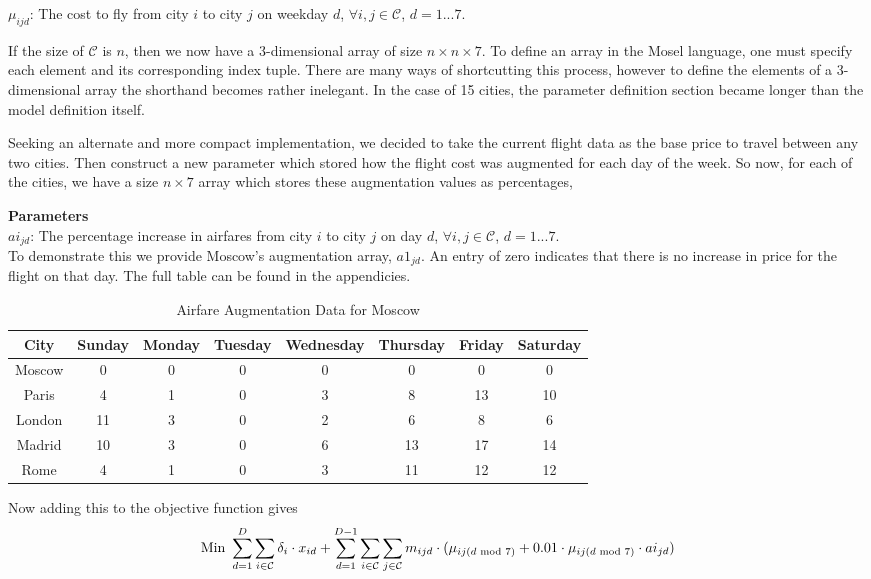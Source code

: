 \documentclass[12pt]{article}
\begin{document}
$\mu_{ijd}$: The cost to fly from city $i$ to city $j$ on weekday $d$, $\forall i,j \in \mathcal{C}$, $d=1...7$.

If the size of $\mathcal{C}$ is $n$, then we now have a 3-dimensional array of size $n\times n\times 7$. To define an array in the Mosel language, one must specify each element and its corresponding index tuple. There are many ways of shortcutting this process, however to define the elements of a 3-dimensional array the shorthand becomes rather inelegant. In the case of 15 cities, the parameter definition section became longer than the model definition itself.

Seeking an alternate and more compact implementation, we decided to take the current flight data as the base price to travel between any two cities. Then construct a new parameter which stored how the flight cost was augmented for each day of the week. So now, for each of the cities, we have a size $n \times 7$ array which stores these augmentation values as percentages,

\textbf{Parameters} \\
$ai_{jd}$: The percentage increase in airfares from city $i$ to city $j$ on day $d$, $\forall i,j \in \mathcal{C}$, $d=1...7$.\\

To demonstrate this we provide Moscow's augmentation array, $a1_{jd}$. An entry of zero indicates that there is no increase in price for the flight on that day. The full table can be found in the appendicies.\\
\begin{table}[h]
	\caption{Airfare Augmentation Data for Moscow}
	\centering
	\vspace{1mm}
	\begin{tabular}{c|c|c|c|c|c|c|c}
		\hline
		\rule{0pt}{2ex} City & Sunday & Monday & Tuesday & Wednesday & Thursday & Friday & Saturday \\
		\hline
		\rule{0pt}{2ex}Moscow & 0 & 0 & 0 & 0 & 0 & 0 & 0 \\
		Paris & 4 & 1 & 0 & 3 & 8 & 13 & 10 \\
		London & 11 & 3 & 0 & 2 & 6 & 8 & 6 \\
		Madrid & 10 & 3 & 0 & 6 & 13 & 17 & 14 \\
		Rome & 4 & 1 & 0 & 3 & 11 & 12 & 12 \\
	\end{tabular}
\end{table}

Now adding this to the objective function gives
\begin{equation*}
\text{Min } \sum_{d=1}^{D} \sum_{i \in \mathcal{C}} \delta_{i} \cdot x_{id} + \sum_{d=1}^{D-1} \sum_{i \in \mathcal{C}} \sum_{j \in \mathcal{C}} m_{ijd} \cdot (\mu_{ij(d \text{ mod }7)} + 0.01 \cdot \mu_{ij(d \text{ mod }7)} \cdot ai_{jd}) \\
\end{equation*}
\end{document}
